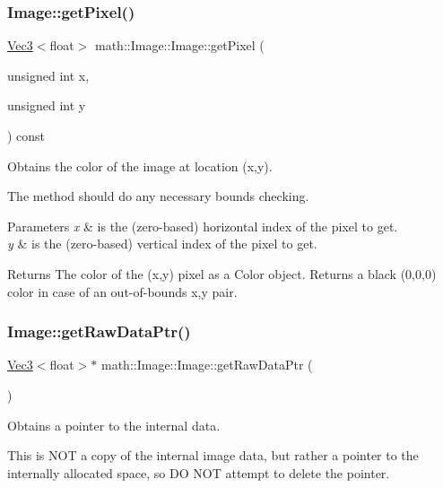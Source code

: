 \subsubsection{\texorpdfstring{Image\+::get\+Pixel()}{Image::getPixel()}}
{\footnotesize\ttfamily \hyperlink{classmath_1_1_vec3}{Vec3}$<$float$>$ math\+::\+Image\+::\+Image\+::get\+Pixel (\begin{DoxyParamCaption}\item[{unsigned int}]{x,  }\item[{unsigned int}]{y }\end{DoxyParamCaption}) const}

Obtains the color of the image at location (x,y).

The method should do any necessary bounds checking.


\begin{DoxyParams}{Parameters}
{\em x} & is the (zero-\/based) horizontal index of the pixel to get. \\
\hline
{\em y} & is the (zero-\/based) vertical index of the pixel to get.\\
\hline
\end{DoxyParams}
\begin{DoxyReturn}{Returns}
The color of the (x,y) pixel as a Color object. Returns a black (0,0,0) color in case of an out-\/of-\/bounds x,y pair. 
\end{DoxyReturn}
\mbox{\label{classmath_1_1_image_a11850e9ecae1cced03a8ca2ad9469616}} 
\subsubsection{\texorpdfstring{Image\+::get\+Raw\+Data\+Ptr()}{Image::getRawDataPtr()}}
{\footnotesize\ttfamily \hyperlink{classmath_1_1_vec3}{Vec3}$<$float$>$$\ast$ math\+::\+Image\+::\+Image\+::get\+Raw\+Data\+Ptr (\begin{DoxyParamCaption}{ }\end{DoxyParamCaption})}

Obtains a pointer to the internal data.

This is N\+OT a copy of the internal image data, but rather a pointer to the internally allocated space, so DO N\+OT attempt to delete the pointer. \mbox{\label{classmath_1_1_image_a845cd219c6624862cc0c632a8a9efd5f}} 
